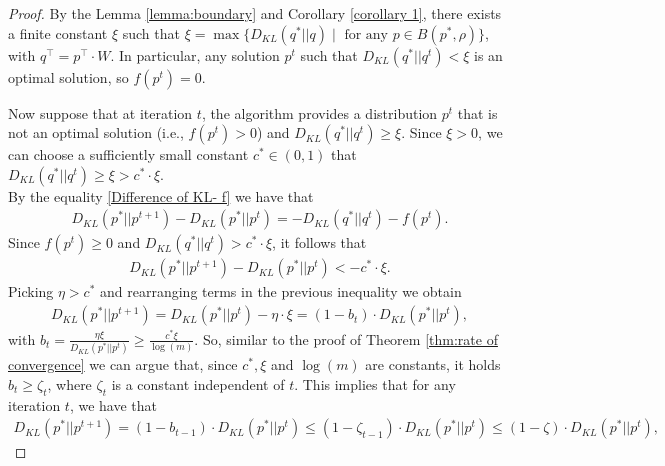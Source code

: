 \documentclass[11pt, letterpaper]{article}
\begin{document}
\begin{proof}
By the Lemma \ref{lemma:boundary} and Corollary \ref{corollary 1}, there exists a finite constant $\xi$ such that 
$\xi = \max \{D_{KL}(q^*|| q) \mid \text{ for any }p \in B(p^*, \rho)\}$, with $q^{\top} = p^{\top}\cdot W$. In particular, any solution $p^t$ such that $D_{KL}(q^*|| q^t) <  \xi$ is an optimal solution, so $f(p^t) = 0$. 

Now suppose that at iteration $t$, the algorithm provides a distribution $p^t$ that is not an optimal solution (i.e., $f(p^t) > 0$) and $D_{KL}(q^*|| q^t) \geq \xi$. Since $\xi > 0$, we can choose a sufficiently small constant $c^* \in (0,1)$ that $D_{KL}(q^*|| q^t) \geq \xi > c^* \cdot \xi$. \\


\noindent By the equality \eqref{Difference of KL- f} we have that 
\begin{equation*}
\begin{split}
D_{KL}(p^* || p^{t+1}) - D_{KL}(p^* || p^{t}) = - D_{KL}(q^*||q^t) - f(p^t).
\end{split}
\end{equation*}
Since $f(p^t) \geq 0$ and $D_{KL}(q^*|| q^t)> c^* \cdot \xi$, it follows that
\begin{equation*}
\begin{split}
D_{KL}(p^* || p^{t+1}) - D_{KL}(p^* || p^{t}) <- c^*\cdot \xi.
\end{split}
\end{equation*}
Picking $\eta > c^*$ and rearranging terms in the previous inequality we obtain
\begin{equation*}
\begin{split}
D_{KL}(p^* || p^{t+1})  =  D_{KL}(p^* || p^{t})- \eta \cdot \xi = (1-b_{t}) \cdot D_{KL}(p^* || p^{t}),
\end{split}
\end{equation*}
with $b_{t} =  \frac{\eta \xi} {D_{KL}(p^* || p^{t})} \geq \frac{c^* \xi} {\log (m) }$. 
So, similar to the proof of Theorem \ref{thm:rate of convergence} we can argue that, since $c^*,\xi$ and $\log (m)$ are constants, it holds $b_{t} \geq \zeta_{t}$, where $\zeta_{t}$ is a constant independent of $t$. This implies that for any iteration $t$, we have that
\begin{equation*}
\begin{split}
    D_{KL}(p^* || p^{t+1}) = (1-b_{t-1})\cdot D_{KL}(p^* || p^{t}) \leq (1-\zeta_{t-1}) \cdot D_{KL}(p^* || p^{t})\leq (1-\zeta) \cdot D_{KL}(p^* || p^{t}),
\end{split}

\end{equation*}
\end{proof}
\end{document}
